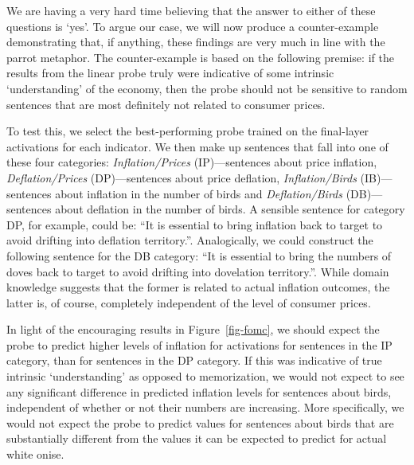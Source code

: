 \documentclass{article}
\theoremstyle{plain}
\theoremstyle{definition}
\theoremstyle{remark}
\begin{document}
We are having a very hard time believing that the answer to either of these questions is `yes'. To argue our case, we will now produce a counter-example demonstrating that, if anything, these findings are very much in line with the parrot metaphor. The counter-example is based on the following premise: if the results from the linear probe truly were indicative of some intrinsic `understanding' of the economy, then the probe should not be sensitive to random sentences that are most definitely not related to consumer prices.

To test this, we select the best-performing probe trained on the final-layer activations for each indicator. We then make up sentences that fall into one of these four categories: \emph{Inflation/Prices} (IP)---sentences about price inflation, \emph{Deflation/Prices} (DP)---sentences about price deflation, \emph{Inflation/Birds} (IB)---sentences about inflation in the number of birds and \emph{Deflation/Birds} (DB)---sentences about deflation in the number of birds. A sensible sentence for category DP, for example, could be: ``It is essential to bring inflation back to target to avoid drifting into deflation territory.''. Analogically, we could construct the following sentence for the DB category: ``It is essential to bring the numbers of doves back to target to avoid drifting into dovelation territory.''. While domain knowledge suggests that the former is related to actual inflation outcomes, the latter is, of course, completely independent of the level of consumer prices.


In light of the encouraging results in Figure~\ref{fig-fomc}, we should expect the probe to predict higher levels of inflation for activations for sentences in the IP category, than for sentences in the DP category. If this was indicative of true intrinsic `understanding' as opposed to memorization, we would not expect to see any significant difference in predicted inflation levels for sentences about birds, independent of whether or not their numbers are increasing. More specifically, we would not expect the probe to predict values for sentences about birds that are substantially different from the values it can be expected to predict for actual white onise. %
\end{document}

